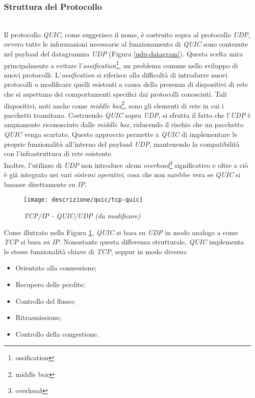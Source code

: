 \subsubsection{Struttura del Protocollo}
~\\ 
\indent Il protocollo \emph{QUIC}, come suggerisce il nome, è costruito sopra al protocollo \emph{UDP}, ovvero tutte le informazioni necessarie al funzionamento di \emph{QUIC} sono contenute nel payload del datagramma \emph{UDP} (Figura \ref{udp-datagram}). 
Questa scelta mira principalmente a evitare l'\emph{ossification}\footnote{\gls{ossification}}, un problema comune nello sviluppo di nuovi protocolli.
L'\emph{ossification} si riferisce alla difficoltà di introdurre nuovi protocolli o modificare quelli esistenti a causa della presenza di dispositivi di rete che si aspettano dei comportamenti specifici dai protocolli conosciuti. Tali dispositivi, noti anche come \emph{middle box}\footnote{\gls{middle box}}, sono gli elementi di rete in cui i pacchetti transitano. 
Costruendo \emph{QUIC} sopra \emph{UDP}, si sfrutta il fatto che l'\emph{UDP} è ampiamente riconosciuto dalle \emph{middle box}, riducendo il rischio che un pacchetto \emph{QUIC} venga scartato. 
Questo approccio permette a \emph{QUIC} di implementare le proprie funzionalità all'interno del payload \emph{UDP}, mantenendo la compatibilità con l'infrastruttura di rete esistente.
\\
Inoltre, l'utilizzo di \emph{UDP} non introduce alcun \emph{overhead}\footnote{\gls{overhead}} significativo e oltre a ciò è già integrato nei vari \emph{sistemi operativi}, cosa che non sarebbe vera se \emph{QUIC} si basasse direttamente su \emph{IP}.
\begin{figure}[!h]
    \centering
    \texttt{[image: descrizione/quic/tcp-quic]}
    \caption{\emph{TCP/IP - QUIC/UDP (da modificare)}}
    \label{tcp-quic}
\end{figure}
\noindent Come illutrato nella Figura \ref{tcp-quic}, \emph{QUIC} si basa su \emph{UDP} in modo analogo a come \emph{TCP} si basa su \emph{IP}.
Nonostante questa differenza strutturale, \emph{QUIC} implementa le stesse funzionalità chiave di \emph{TCP}, seppur in modo diverso:
\begin{itemize}
    \item Orientato alla connessione;
    \item Recupero delle perdite;
    \item Controllo del flusso;
    \item Ritrasmissione;
    \item Controllo della congestione.
\end{itemize}
